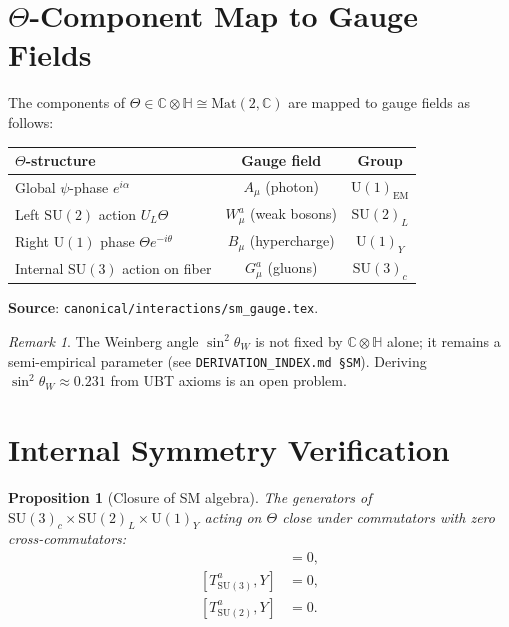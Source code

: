 \documentclass[11pt,a4paper]{article}
\newtheorem{proposition}[theorem]{Proposition}
\theoremstyle{definition}
\theoremstyle{remark}
\newtheorem{remark}[theorem]{Remark}
\begin{document}
\section{$\Theta$-Component Map to Gauge Fields}\label{sec:map}

The components of $\Theta \in \mathbb{C}\otimes\mathbb{H} \cong \mathrm{Mat}(2,\mathbb{C})$
are mapped to gauge fields as follows:

\begin{center}
\begin{tabular}{lcc}
\toprule
$\Theta$-structure & Gauge field & Group \\
\midrule
Global $\psi$-phase $e^{i\alpha}$ & $A_\mu$ (photon) & $\mathrm{U}(1)_{\mathrm{EM}}$ \\
Left $\mathrm{SU}(2)$ action $U_L\Theta$ & $W^a_\mu$ (weak bosons) & $\mathrm{SU}(2)_L$ \\
Right $\mathrm{U}(1)$ phase $\Theta e^{-i\theta}$ & $B_\mu$ (hypercharge) & $\mathrm{U}(1)_Y$ \\
Internal $\mathrm{SU}(3)$ action on fiber & $G^a_\mu$ (gluons) & $\mathrm{SU}(3)_c$ \\
\bottomrule
\end{tabular}
\end{center}

\noindent\textbf{Source}: \texttt{canonical/interactions/sm\_gauge.tex}.

\begin{remark}
The Weinberg angle $\sin^2\theta_W$ is not fixed by $\mathbb{C}\otimes\mathbb{H}$
alone; it remains a semi-empirical parameter (see \texttt{DERIVATION\_INDEX.md
\S SM}).  Deriving $\sin^2\theta_W \approx 0.231$ from UBT axioms is an open
problem.
\end{remark}

\section{Internal Symmetry Verification}\label{sec:verify}

\begin{proposition}[Closure of SM algebra]
The generators of $\mathrm{SU}(3)_c \times \mathrm{SU}(2)_L \times \mathrm{U}(1)_Y$
acting on $\Theta$ close under commutators with zero cross-commutators:
\begin{align}
  [T^a_{\mathrm{SU}(3)}, T^b_{\mathrm{SU}(2)}] &= 0, \\
  [T^a_{\mathrm{SU}(3)}, Y]                     &= 0, \\
  [T^a_{\mathrm{SU}(2)}, Y]                     &= 0.
\end{align}
\end{proposition}
\end{document}
